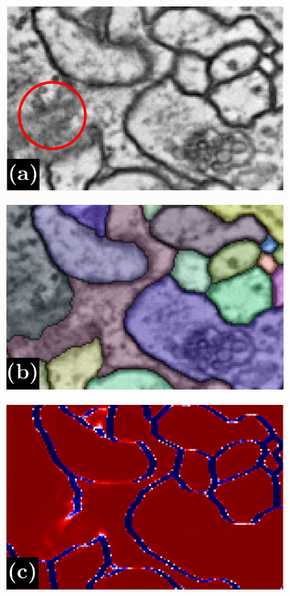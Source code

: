 \begin{figure}[t]
\begin{subfigure}[t]{0.16\linewidth}
\centering
\includegraphics[width=0.99\linewidth,trim=0in 0in 0in 0.2in,clip]{./figures/LSIMasks/aff_compare_designer/raw.pdf} %
\end{subfigure}
\begin{subfigure}[t]{0.16\linewidth}
\centering
\includegraphics[width=0.99\linewidth,trim=0in 0in 0in 0.2in,clip]{./figures/LSIMasks/aff_compare_designer/GT.pdf} %
\end{subfigure}
\begin{subfigure}[t]{0.16\linewidth}
\centering
\includegraphics[width=0.99\linewidth,trim=0in 0in 0in 0.2in,clip]{./figures/LSIMasks/aff_compare_designer/dice_2.pdf} %

\end{subfigure}
\end{figure}
